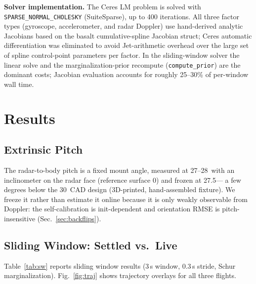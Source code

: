 \documentclass[conference]{IEEEtran}
\begin{document}
\textbf{Solver implementation.}
The Ceres LM problem is solved with \texttt{SPARSE\_NORMAL\_CHOLESKY}
(SuiteSparse), up to 400 iterations.
All three factor types (gyroscope, accelerometer, and radar Doppler)
use hand-derived analytic Jacobians based on the basalt
cumulative-spline Jacobian struct; Ceres automatic differentiation was
eliminated to avoid Jet-arithmetic overhead over the large set of
spline control-point parameters per factor.
In the sliding-window solver the linear solve and the
marginalization-prior recompute (\texttt{compute\_prior}) are the
dominant costs; Jacobian evaluation accounts for roughly 25--30\% of
per-window wall time.

\section{Results}
\label{sec:results}

\subsection{Extrinsic Pitch}
The radar-to-body pitch is a fixed mount angle, measured at
27--28\degree\ with an inclinometer on the radar face (reference surface
0\degree) and frozen at 27.5\degree --- a few degrees below the
30\degree\ CAD design (3D-printed, hand-assembled fixture).  We freeze
it rather than estimate it online because it is only weakly observable
from Doppler: the self-calibration is init-dependent and orientation
RMSE is pitch-insensitive (Sec.~\ref{sec:backflips}).

\subsection{Sliding Window: Settled vs.\ Live}
\label{sec:sw_results}

Table~\ref{tab:sw} reports sliding window results
(3\,s window, 0.3\,s stride, Schur marginalization).
Fig.~\ref{fig:traj} shows trajectory overlays for all three flights.
\end{document}
